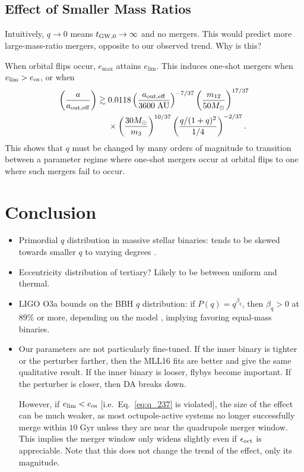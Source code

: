 \documentclass[
        fleqn,
        usenatbib,
    ]{mnras}
\newcommand*{\p}[1]{\left(#1\right)}
\begin{document}
\subsection{Effect of Smaller Mass Ratios}

Intuitively, $q \to 0$ means $t_{\rm GW, 0} \to \infty$ and no mergers. This
would predict more large-mass-ratio mergers, opposite to our observed trend. Why
is this?

When orbital flips occur, $e_{\max}$ attains $e_{\lim}$. This induces one-shot
mergers when $e_{\lim} > e_{\rm os}$, or when
\begin{align}
    \p{\frac{a}{a_{\rm out, eff}}} \gtrsim{}&
        0.0118
        \p{\frac{a_{\rm out, eff}}{3600\;\mathrm{AU}}}^{-7/37}
        \p{\frac{m_{12}}{50M_{\odot}}}^{17/37}\nonumber\\
        &\times\p{\frac{30M_{\odot}}{m_3}}^{10/37}
        \p{\frac{q / (1 + q)^2}{1/4}}^{-2/37}.\label{eq:q_237}
\end{align}
This shows that $q$ must be changed by many orders of magnitude to transition
between a parameter regime where one-shot mergers occur at orbital flips to one
where such mergers fail to occur.

\section{Conclusion}

\begin{itemize}
    \item Primordial $q$ distribution in massive stellar binaries: tends to be
        skewed towards smaller $q$ to varying degrees \citep{sana2012binary,
        el2019discovery}.

    \item Eccentricity distribution of tertiary? Likely to be between uniform
        and thermal.

    \item LIGO O3a bounds on the BBH $q$ distribution: if $P(q) = q^{\beta_q}$,
        then $\beta_q > 0$ at $89\%$ or more, depending on the model
        \citep{LIGOO3a}, implying favoring equal-mass binaries.

    \item Our parameters are not particularly fine-tuned. If the inner binary is
        tighter or the perturber farther, then the MLL16 fits are better and
        give the same qualitative result. If the inner binary is looser, flybys
        become important. If the perturber is closer, then DA breaks down.

        However, if $e_{\lim} < e_{\rm os}$ [i.e.\ Eq.~\eqref{eq:q_237} is
        violated], the size of the effect can be much weaker, as most
        octupole-active systems no longer successfully merge within
        $10\;\mathrm{Gyr}$ unless they are near the quadrupole merger window.
        This implies the merger window only widens slightly even if
        $\epsilon_{\rm oct}$ is appreciable. Note that this does not change the
        trend of the effect, only its magnitude.
\end{itemize}
\end{document}
